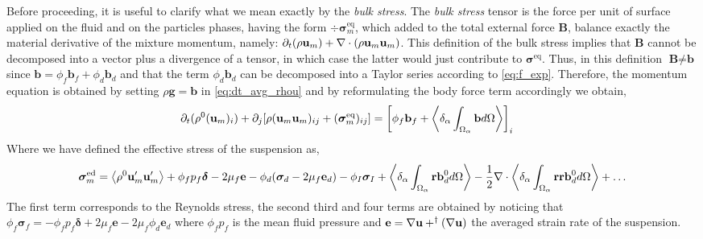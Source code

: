 Before proceeding, it is useful to clarify what we mean exactly by the \textit{bulk stress}.
The \textit{bulk stress} tensor is the force per unit of surface applied on the fluid and on the particles phases, having the form $\div \bm{\sigma}^\text{eq}_m$, which added to the total external force $\textbf{B}$, balance exactly the material derivative of the mixture momentum, namely: $\partial_t (\rho \textbf{u}_m) + \mathbf{\nabla}\cdot (\rho \textbf{u}_m\textbf{u}_m)$. 
This definition of the bulk stress implies that $\textbf{B}$ cannot be decomposed into a vector plus a divergence of a tensor, in which case the latter would just contribute to $\bm{\sigma}^\text{eq}$.
Thus, in this definition $\textbf{B} \neq \textbf{b}$ since $\textbf{b} = \phi_f \textbf{b}_f+\phi_d \textbf{b}_d$ and that the term $\phi_d \textbf{b}_d$ can be decomposed into a Taylor series according to \ref{eq:f_exp}. 
Therefore, the momentum equation is obtained by setting $\rho \textbf{g} = \textbf{b}$ in \ref{eq:dt_avg_rhou} and by reformulating the body force term accordingly we obtain,
\begin{align}
    \label{eq:momentum_bulk}
    \partial_t (\rho^0 (\textbf{u}_m)_i)
    + \partial_j  [\rho (\textbf{u}_m \textbf{u}_m)_{ij}
    + (\bm\sigma_{m}^\text{eq})_{ij}]
    &= \left[\phi_f \textbf{b}_f + \left<\delta_\alpha \int_{\Omega_\alpha} \textbf{b} d\Omega\right>\right]_i
\end{align}
Where we have defined the effective stress of the suspension as,
\begin{equation}
    \bm{\sigma}_m^\text{ed}
    = 
    \left<\rho^0\textbf{u}_m'\textbf{u}'_m\right>
    + \phi_fp_f\bm\delta
    - 2\mu_f\textbf{e}
    - \phi_d(\bm{\sigma}_d - 2\mu_f \textbf{e}_d)
    - \phi_I \bm{\sigma}_I
    + \left<\delta_\alpha \int_{\Omega_\alpha} \textbf{r}\textbf{b}_d^0 d\Omega\right>
    -\frac{1}{2} \mathbf{\nabla}\cdot \left<\delta_\alpha \int_{\Omega_\alpha} \textbf{rr}\textbf{b}_d^0 d\Omega\right> + \ldots
    \label{eq:sigma_bulk}
\end{equation}
The first term corresponds to the Reynolds stress, the second third and four terms are obtained by noticing that 
$
    \phi_f \bm\sigma_f
    = -\phi_f p_f \bm\delta
    + 2\mu_f \textbf{e}
    - 2 \mu_f \phi_d \textbf{e}_d 
$
where $\phi_f p_f$ is the mean fluid pressure and $\textbf{e} = \mathbf{\nabla} \textbf{u} + ^\dagger(\mathbf{\nabla} \textbf{u})$ the averaged strain rate of the suspension. 
